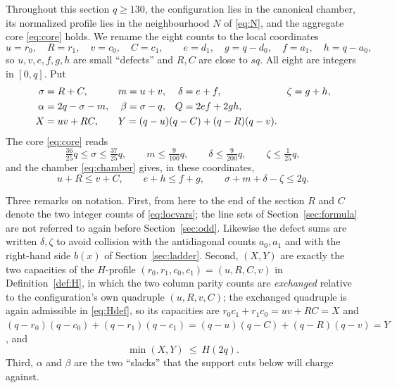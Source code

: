\documentclass[11pt]{amsart}
\theoremstyle{definition}
\theoremstyle{remark}
\begin{document}
Throughout this section $q\ge130$, the configuration lies in the canonical chamber, its normalized profile lies in the neighbourhood $N$ of \eqref{eq:N}, and the aggregate core \eqref{eq:core} holds. We rename the eight counts to the local coordinates
\begin{equation}\label{eq:locvars}
u=r_0,\quad R=r_1,\quad v=c_0,\quad C=c_1,\qquad
e=d_1,\quad g=q-d_0,\quad f=a_1,\quad h=q-a_0,
\end{equation}
so $u,v,e,f,g,h$ are small ``defects'' and $R,C$ are close to $sq$. All eight are integers in $[0,q]$. Put
\begin{equation}\label{eq:aggregates}
\begin{aligned}
\sigma&=R+C, & m&=u+v, & \delta&=e+f, & \zeta&=g+h,\\
\alpha&=2q-\sigma-m, & \beta&=\sigma-q, & Q&=2ef+2gh,\\
X&=uv+RC, & \multicolumn{4}{l}{$Y=(q-u)(q-C)+(q-R)(q-v).$}
\end{aligned}
\end{equation}
The core \eqref{eq:core} reads
\begin{equation}\label{eq:core2}
\tfrac{36}{25}q\le\sigma\le\tfrac{37}{25}q,\qquad m\le\tfrac{9}{100}q,\qquad \delta\le\tfrac{9}{200}q,\qquad \zeta\le\tfrac1{25}q ,
\end{equation}
and the chamber \eqref{eq:chamber} gives, in these coordinates,
\begin{equation}\label{eq:chamber2}
u+R\le v+C,\qquad e+h\le f+g,\qquad \sigma+m+\delta-\zeta\le2q .
\end{equation}

Three remarks on notation.  First, from here to the end of the section $R$
and $C$ denote the two integer counts of \eqref{eq:locvars}; the line sets of
Section~\ref{sec:formula} are not referred to again before
Section~\ref{sec:odd}.  Likewise the defect sums are written $\delta,\zeta$
to avoid collision with the antidiagonal counts $a_0,a_1$ and with the
right-hand side $b(x)$ of Section~\ref{sec:ladder}.  Second, $(X,Y)$ are
exactly the two capacities of the $H$-profile
$(r_0,r_1,c_0,c_1)=(u,R,C,v)$ in Definition~\ref{def:H}, in which the two
column parity counts are \emph{exchanged} relative to the configuration's own
quadruple $(u,R,v,C)$; the exchanged quadruple is again admissible in
\eqref{eq:Hdef}, so its capacities are $r_0c_1+r_1c_0=uv+RC=X$ and
$(q-r_0)(q-c_0)+(q-r_1)(q-c_1)=(q-u)(q-C)+(q-R)(q-v)=Y$, and
\begin{equation}\label{eq:XYH}
\min(X,Y)\ \le\ H(2q).
\end{equation}
Third, $\alpha$ and $\beta$ are the two ``slacks'' that the support cuts below will charge against.
\end{document}
